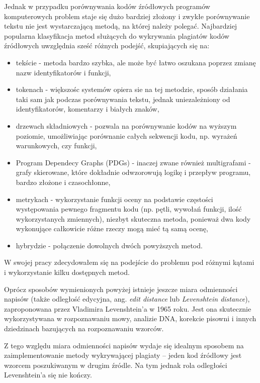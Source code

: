 \documentclass[a4paper,12pt,twoside]{article}
\begin{document}
Jednak w przypadku porównywania kodów źródłowych programów komputerowych problem staje się dużo bardziej złożony i zwykłe porównywanie tekstu nie jest wystarczającą metodą, na której należy polegać\cite{arwin2006}. Najbardziej popularna klasyfikacja metod służących do wykrywania plagiatów kodów źródłowych uwzględnia sześć różnych podejść, skupiających się na\cite{roycordy2007}:
\begin{itemize}
\item tekście - metoda bardzo szybka, ale może być łatwo oszukana poprzez zmianę nazw identyfikatorów i funkcji,
\item tokenach - większośc systemów opiera sie na tej metodzie, sposób działania taki sam jak podczas porównywania tekstu, jednak uniezależniony od identyfikatorów, komentarzy i białych znaków,
\item drzewach składniowych - pozwala na porównywanie kodów na wyższym poziomie, umożliwiając porównanie całych sekwencji kodu, np. wyrażeń warunkowych, czy funkcji,
\item Program Dependecy Graphs (PDGs) - inaczej zwane również multigrafami - grafy skierowane, które dokładnie odwzorowują logikę i przepływ programu, bardzo złożone i czasochłonne,
\item metrykach - wykorzystanie funkcji oceny na podstawie częstości występowania pewnego fragmentu kodu (np. pętli, wywołań funkcji, ilość wykorzystanych zmiennych), niezbyt skuteczna metoda, ponieważ dwa kody wykonujące całkowicie różne rzeczy mogą mieć tą samą ocenę,
\item hybrydzie - połączenie dowolnych dwóch powyższych metod.
\end{itemize}

W swojej pracy zdecydowałem się na podejście do problemu pod różnymi kątami i wykorzystanie kilku dostępnych metod.

Oprócz sposobów wymienionych powyżej istnieje jeszcze miara odmienności napisów (także odległość edycyjna, ang. \textit{edit distance} lub \textit{Levenshtein distance}), zaproponowana przez Vladimira Levenshtein'a w 1965 roku\cite{editdistance}. Jest ona skutecznie wykorzystywana w rozpoznawaniu mowy, analizie DNA, korekcie pisowni i innych dziedzinach bazujących na rozpoznawaniu wzorców.

Z tego względu miara odmienności napisów wydaje się idealnym sposobem na zaimplementowanie metody wykrywającej plagiaty -- jeden kod źródłowy jest wzorcem poszukiwanym w drugim źródle. Na tym jednak rola odległości Levenshtein'a się nie kończy. 
\end{document}
